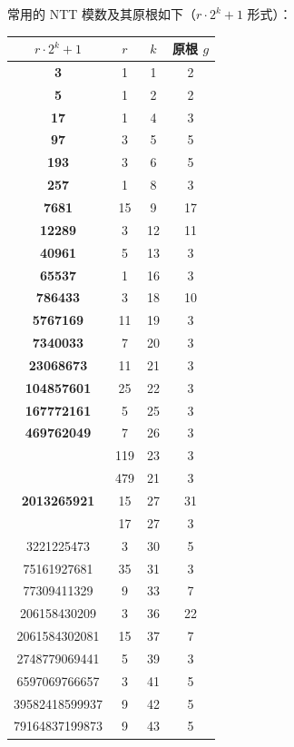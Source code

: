 
常用的 NTT 模数及其原根如下（$r\cdot 2^k+1$ 形式）：

\begin{table}[htbp]
\centering
{}
\setlength{\arrayrulewidth}{0.8pt}
\begin{tabular}{|c|c|c|c|}
\hline
$r\cdot 2^k+1$ & $r$ & $k$ & 原根 $g$ \\
\hline
\textbf{3} & 1 & 1 & 2 \\
\textbf{5} & 1 & 2 & 2 \\
\textbf{17} & 1 & 4 & 3 \\
\textbf{97} & 3 & 5 & 5 \\
\textbf{193} & 3 & 6 & 5 \\
\textbf{257} & 1 & 8 & 3 \\
\textbf{7681} & 15 & 9 & 17 \\
\textbf{12289} & 3 & 12 & 11 \\
\textbf{40961} & 5 & 13 & 3 \\
\textbf{65537} & 1 & 16 & 3 \\
\textbf{786433} & 3 & 18 & 10 \\
\textbf{5767169} & 11 & 19 & 3 \\
\textbf{7340033} & 7 & 20 & 3 \\
\textbf{23068673} & 11 & 21 & 3 \\
\textbf{104857601} & 25 & 22 & 3 \\
\textbf{167772161} & 5 & 25 & 3 \\
\textbf{469762049} & 7 & 26 & 3 \\
\cellcolor[gray]{0.8}{\textbf{998244353}} & 119 & 23 & 3 \\
\cellcolor[gray]{0.8}{\textbf{1004535809}} & 479 & 21 & 3 \\
\textbf{2013265921} & 15 & 27 & 31 \\
\cellcolor[gray]{0.8}{2281701377} & 17 & 27 & 3 \\
3221225473 & 3 & 30 & 5 \\
75161927681 & 35 & 31 & 3 \\
77309411329 & 9 & 33 & 7 \\
206158430209 & 3 & 36 & 22 \\
2061584302081 & 15 & 37 & 7 \\
2748779069441 & 5 & 39 & 3 \\
6597069766657 & 3 & 41 & 5 \\
39582418599937 & 9 & 42 & 5 \\
79164837199873 & 9 & 43 & 5 \\

\end{tabular}
\end{table}
